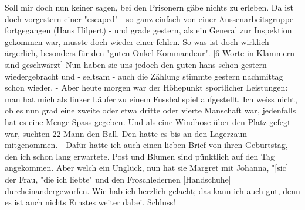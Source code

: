 \def\day{14. mai 1943}
\mktitle

Soll mir doch nun keiner sagen, bei den Prisonern g\"{a}be nichts zu erleben.
Da ist doch vorgestern einer "escaped" - so ganz einfach von einer Aussenarbeitsgruppe fortgegangen (Hans Hilpert) - und grade gestern, als ein General zur Inspektion gekommen war, musste doch wieder einer fehlen.
So was ist doch wirklich \"{a}rgerlich, besonders f\"{u}r den "guten Onkel Kommandeur".
{\color{red} [6 Worte in Klammern sind geschw\"{a}rzt] }
Nun haben sie uns jedoch den guten hans schon gestern wiedergebracht und - seltsam - auch die Z\"{a}hlung stimmte gestern nachmittag schon wieder.
- Aber heute morgen war der H\"{o}hepunkt sportlicher Leistungen: man hat mich als linker L\"{a}ufer zu einem Fussballspiel aufgestellt.
Ich weiss nicht, ob es nun grad eine zweite oder etwa dritte oder vierte Manschaft war, jedenfalls hat es eine Menge Spass gegeben.
Und als eine Windhose \"{u}ber den Platz gefegt war, suchten 22 Mann den Ball.
Den hatte es bis an den Lagerzaun mitgenommen.
- Daf\"{u}r hatte ich auch einen lieben Brief von ihren Geburtstag, den ich schon lang erwartete.
Post und Blumen sind p\"{u}nktlich auf den Tag angekommen.
Aber welch ein Ungl\"{u}ck, nun hat sie Margret mit Johanna, "{\color{red}[sic]} der Frau, "die ich liebte" und den Froschledernen {\color{red}[Handschuhe] } durcheinandergeworfen.
Wie hab ich herzlich gelacht; das kann ich auch gut, denn es ist auch nichts Ernstes weiter dabei.
Schluss!
\clearpage

